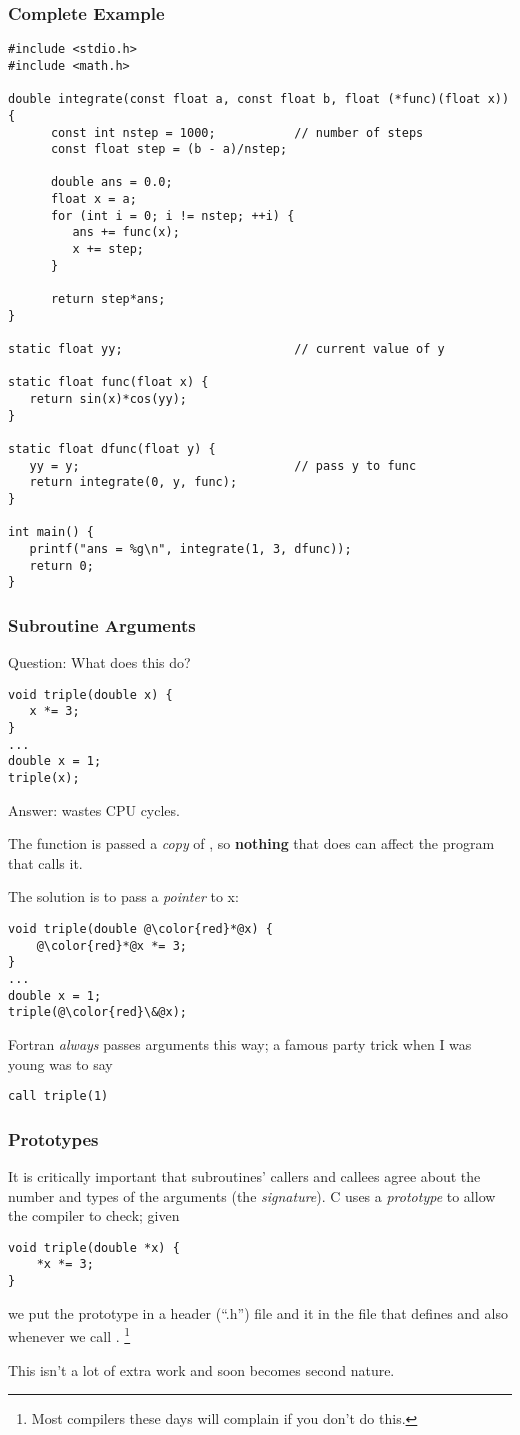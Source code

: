 \documentclass[10pt, t]{beamer}
\begin{document}
\begin{frame}[fragile]
\frametitle{Complete Example}
\label{sec-3_1_4}

\begin{verbatim}
#include <stdio.h>
#include <math.h>

double integrate(const float a, const float b, float (*func)(float x)) {
      const int nstep = 1000;           // number of steps
      const float step = (b - a)/nstep;

      double ans = 0.0;
      float x = a;
      for (int i = 0; i != nstep; ++i) {
         ans += func(x); 
         x += step;
      }

      return step*ans;
}

static float yy;                        // current value of y

static float func(float x) {
   return sin(x)*cos(yy);
}

static float dfunc(float y) {
   yy = y;                              // pass y to func
   return integrate(0, y, func);
}

int main() {
   printf("ans = %g\n", integrate(1, 3, dfunc));
   return 0;
}
\end{verbatim}
\end{frame}
\begin{frame}[fragile]
\frametitle{Subroutine Arguments}
\label{sec-3_1_5}

Question: What does this do?
\begin{verbatim}
void triple(double x) {
   x *= 3;
}
...
double x = 1;
triple(x);
\end{verbatim}
\pause
Answer: wastes CPU cycles.

The function  is passed a \emph{copy} of , so \textbf{nothing} that  does can 
affect the program that calls it.

\pause
The solution is to pass a \emph{pointer} to x:
\begin{verbatim}
void triple(double @\color{red}*@x) {
    @\color{red}*@x *= 3;
}
...
double x = 1;
triple(@\color{red}\&@x);
\end{verbatim}
\pause
Fortran \emph{always} passes arguments this way; a famous party trick when I was young was to say
\begin{verbatim}
call triple(1)
\end{verbatim}
\end{frame}
\begin{frame}[fragile]
\frametitle{Prototypes}
\label{sec-3_1_6}

It is critically important that subroutines' callers and callees agree about the number and
types of the arguments (the \emph{signature}).  C uses a \emph{prototype} to allow the compiler to check; given
\begin{verbatim}
void triple(double *x) {
    *x *= 3;
}
\end{verbatim}
we put the prototype  in a header (``.h'') file and  
it in the file that defines  and also whenever we call
. \footnote{Most compilers these days will complain if you don't do this. }

This isn't a lot of extra work and soon becomes second nature.
\end{frame}
\end{document}
